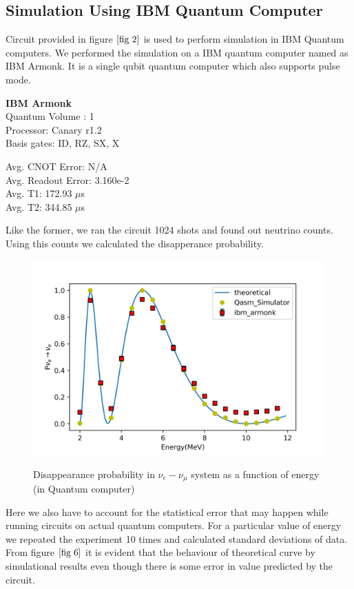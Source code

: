 \documentclass[12pt,a4paper]{report}
\begin{document}
\subsection{Simulation Using IBM Quantum Computer}
Circuit provided in figure $\ref{fig 2}$ is used to perform simulation in IBM Quantum computers. We performed the simulation on a IBM quantum computer named as IBM Armonk. It is a single qubit quantum computer which also supports pulse mode.\\

\begin{minipage}{0.5\textwidth}
\textbf{IBM Armonk}\\	
Quantum Volume : 1\\
Processor: Canary r1.2\\
Basis gates: ID, RZ, SX, X\\
\end{minipage}%
\begin{minipage}{0.5\textwidth}
Avg. CNOT Error: N/A\\
Avg. Readout Error: 3.160e-2\\
Avg. T1: 172.93 $\mu$s\\
Avg. T2: 344.85 $\mu$s
\end{minipage}

Like the former, we ran the circuit 1024 shots and found out neutrino counts. Using this counts we calculated the disapperance probability. 
\begin{figure}[H]
	\graphicspath{ {./Images/} }
	\centering	
	{\includegraphics[scale=0.8]{fig_6.png}}
	\caption{Disappearance probability in $\nu_{e}-\nu_{\mu}$ system as a function of energy (in Quantum computer)}
	\label{fig 6}
\end{figure}\par
Here we also have to account for the statistical error that may happen while running circuits on actual quantum computers. For a particular value of energy we repeated the experiment 10 times and calculated standard deviations of data. From figure $\ref{fig 6}$ it is evident that the behaviour of theoretical curve by simulational results even though there is some error in value predicted by the circuit.
\pagebreak
\end{document}
